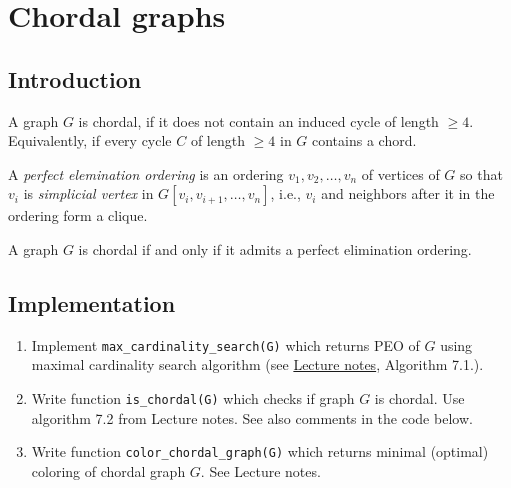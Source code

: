 \chapter{Chordal graphs}

\section{Introduction}

A graph $G$ is chordal, if it does not contain an induced cycle of length $\geq 4$. Equivalently, if every cycle $C$ of length $\geq 4$ in $G$ contains a chord.

A \emph{perfect elemination ordering} is an ordering $v_1, v_2, \dots, v_n$ of vertices of $G$ so that $v_i$ is \emph{simplicial vertex} in $G[v_{i}, v_{i+1}, \dots, v_n]$, i.e., $v_i$ and neighbors after it in the ordering form a clique.

A graph $G$ is chordal if and only if it admits a perfect elimination ordering.

\section{Implementation}

\begin{enumerate}
\item Implement \verb`max_cardinality_search(G)` which returns PEO of $G$ using maximal cardinality search algorithm (see \href{http://matematika.fri.uni-lj.si/dm/discrete_mathematics.pdf}{Lecture notes}, Algorithm 7.1.).
\item Write function \verb`is_chordal(G)` which checks if graph $G$ is chordal. Use algorithm 7.2 from Lecture notes. See also comments in the code below.
\item Write function \verb`color_chordal_graph(G)` which returns minimal (optimal) coloring of chordal graph $G$. See Lecture notes.
\end{enumerate}

